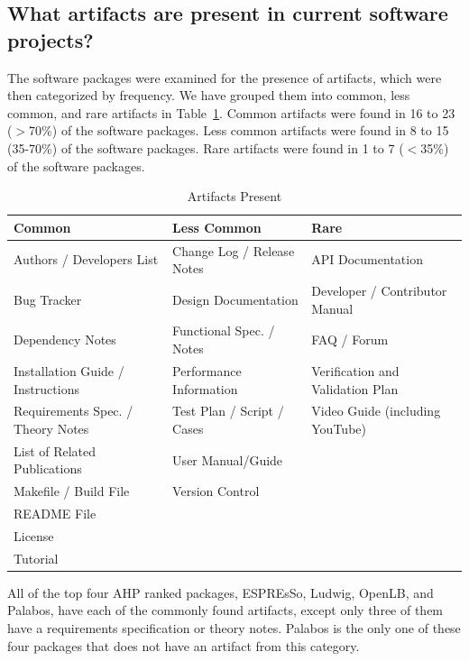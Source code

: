 \documentclass[final, 3p, times, authoryear]{elsarticle}
\begin{document}
\subsection{What artifacts are present in current software projects?}
\label{artifacts}

The software packages were examined for the presence of artifacts, which were
then categorized by frequency. We have grouped them into common, less common,
and rare artifacts in Table~\ref{artifactspresent}. Common artifacts were found
in 16 to 23 ($>$70\%) of the software packages. Less common artifacts were found
in 8 to 15 (35-70\%) of the software packages. Rare artifacts were found in 1 to
7 ($<$35\%) of the software packages. 

\begin{table}
\begin{center}
\begin{tabular}{ p{5.3 cm} p{4.9 cm} p{5 cm}}
\toprule
\textbf{Common} & \textbf{Less Common} & \textbf{Rare} \\
\midrule
Authors / Developers List & Change Log / Release Notes & API Documentation\\
Bug Tracker & Design Documentation & Developer / Contributor Manual\\
Dependency Notes & Functional Spec. / Notes & FAQ / Forum\\
Installation Guide / Instructions & Performance Information & Verification and Validation Plan\\
Requirements Spec. / Theory Notes & Test Plan / Script / Cases & Video Guide (including YouTube)\\
List of Related Publications & User Manual/Guide & \\
Makefile / Build File & Version Control & \\
README File & & \\
License & & \\
Tutorial & & \\
\bottomrule
\end{tabular}
\caption{Artifacts Present} \label{artifactspresent}
\end{center}
\end{table}

All of the top four AHP ranked packages, ESPREsSo, Ludwig, OpenLB, and Palabos,
have each of the commonly found artifacts, except only three of them have a
requirements specification or theory notes. Palabos is the only one of these
four packages that does not have an artifact from this category.
\end{document}
